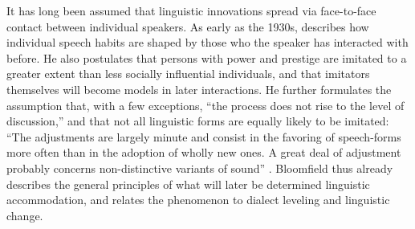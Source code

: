 \documentclass[output=paper,
modfonts
]{langscibook}
\begin{document}
It has long been assumed that linguistic innovations spread via face-to-face contact between individual speakers. As early as the 1930s, \citet[476-477]{bloomfield_language_1933} describes how individual speech habits are shaped by those who the speaker has interacted with before. He also postulates that persons with power and prestige are imitated to a greater extent than less socially influential individuals, and that imitators themselves will become models in later interactions. He further formulates the assumption that, with a few exceptions, ``the process does not rise to the level of discussion,'' and that not all linguistic forms are equally likely to be imitated: ``The adjustments are largely minute and consist in the favoring of speech-forms more often than in the adoption of wholly new ones. A great deal of adjustment probably concerns non-distinctive variants of sound'' \citep[476-477]{bloomfield_language_1933}. Bloomfield thus already describes the general principles of what will later be determined linguistic accommodation, and relates the phenomenon to dialect leveling and linguistic change. 
% 
% 
% 
% 
% 
% 
% 
% 
% 
% 
% 
% 
% 
% 
\end{document}
